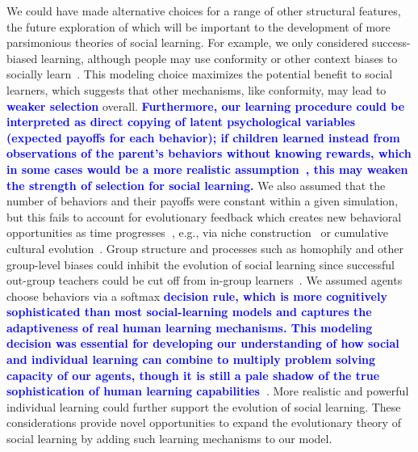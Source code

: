 \documentclass[letterpaper,11.5pt]{scrartcl}
\newcommand{\edit}[1]{{\bfseries \textcolor{blue} {#1}}}
\begin{document}
We could have made alternative choices for a range of other structural features, the future exploration of which
will be important to the development of more parsimonious theories of social learning.  
For example, we only considered success-biased learning, although people may use conformity or other context biases to socially learn~\citep{BoydRicherson1985,Muthukrishna2016a,Smaldino2018b}. This modeling
choice maximizes the potential benefit to social learners, which suggests that
other mechanisms, like conformity, may lead to \edit{weaker selection} overall. 
\edit{Furthermore, our learning procedure could be interpreted as direct copying of
latent psychological variables (expected payoffs for each behavior); if children
learned instead from observations of the parent's behaviors without knowing rewards,
which in some cases would be a more realistic assumption~\citep{Wu2022b}, this may weaken the strength of selection for social learning.} We
also assumed that the number of behaviors and their payoffs were constant within a
given simulation, but this fails to account for evolutionary feedback which creates
new behavioral opportunities as time progresses\edit{~\citep{Chimento2022}}, e.g., via niche
construction~\citep{Smaldino2012a,Heras-Escribano2020} or cumulative cultural
evolution~\citep{Smolla2019,Derex2020}.  Group structure and processes such as
homophily and other group-level biases could inhibit the evolution of social
learning since successful out-group teachers could be cut off from in-group
learners~\citep{Golub2012}. We assumed agents choose behaviors via a softmax
\edit{decision rule, which is more cognitively sophisticated than most
social-learning models and captures the adaptiveness of real human learning
mechanisms. This modeling decision was essential for developing our understanding of
how social and individual learning can combine to multiply problem solving capacity
of our agents, though it is still a pale shadow of the true sophistication of human
learning capabilities~\citep{Schulz2020a,Wu2022}}. More realistic and powerful individual learning could further support the evolution of
social learning. These considerations provide novel opportunities to expand the evolutionary theory of social learning by adding
such learning mechanisms to our model.

\end{document}
